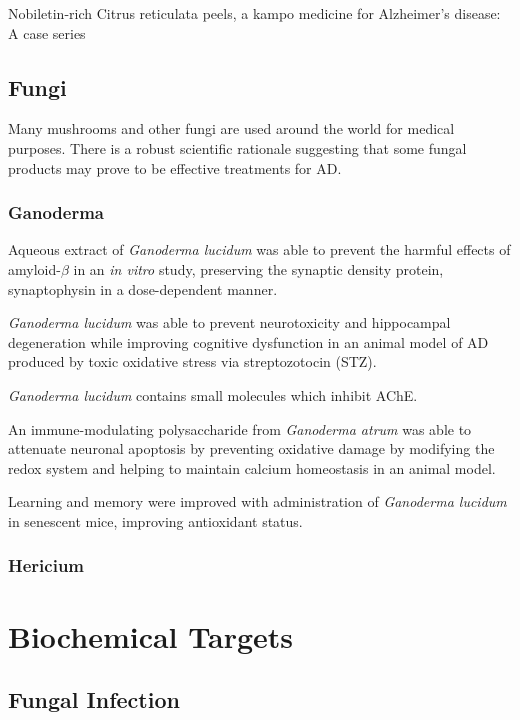 \documentclass[twocolumn]{article}
\begin{document}
Nobiletin-rich Citrus reticulata peels,
a kampo medicine for Alzheimer's disease: A case series
\cite{seki2013nobiletin}


\subsection{Fungi}

Many mushrooms and other fungi are used around the world for medical purposes.
There is a robust scientific rationale suggesting that some
fungal products may prove to be effective treatments for AD.

\subsubsection{Ganoderma}

Aqueous extract of \textit{Ganoderma lucidum}
was able to prevent the harmful effects of
amyloid-$\beta$ in an \textit{in vitro} study,
preserving the synaptic density protein, synaptophysin
in a dose-dependent manner.
\cite{lai2008antagonizing}

\textit{Ganoderma lucidum} was able to prevent neurotoxicity and
hippocampal degeneration while improving cognitive dysfunction in an animal model
of AD produced by toxic oxidative stress via streptozotocin (STZ).
\cite{zhou2012neuroprotective}

\textit{Ganoderma lucidum} contains small molecules which inhibit AChE.
\cite{lee2011selective}

An immune-modulating polysaccharide from \textit{Ganoderma atrum}
was able to attenuate neuronal apoptosis
by preventing oxidative damage by modifying the
redox system and helping to maintain calcium homeostasis
in an animal model.
\cite{li2011ganoderma}

Learning and memory were improved with
administration of \textit{Ganoderma lucidum}
in senescent mice,
improving antioxidant status.
\cite{wang2004effects}


\subsubsection{Hericium}




\section{Biochemical Targets}


\subsection{Fungal Infection}
\end{document}
